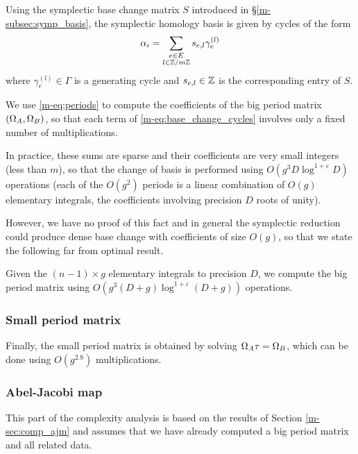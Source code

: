 \documentclass[main.tex]{subfiles}
\begin{document}
   Using the symplectic base change matrix $S$ introduced
   in \S \ref{m-subsec:symp_basis}, the symplectic homology basis is given
   by cycles of the form
   \begin{equation}
       \label{eq:base_change_cycles}
       \alpha_i = \sum_{\substack{e \in E \\ l\in\mathbb{Z}/m\mathbb{Z}}} s_{e,l}\gamma_e^{(l)}
   \end{equation}
   where $\gamma_e^{(l)} \in \Gamma$ is a generating cycle
   and $s_{e,l}\in\mathbb{Z}$ is the corresponding entry of $S$.

   We use \eqref{m-eq:periods} to compute the coefficients of the big period
   matrix $(\Omega_A,\Omega_B)$, so that each term of \eqref{m-eq:base_change_cycles}
   involves only a fixed number of multiplications.

   In practice, these sums are sparse and their coefficients are very small integers
   (less than $m$), so that the change of basis is performed using
   $O(g^3D\log^{1+\varepsilon}D)$ operations
   (each of the $O(g^2)$ periods is a linear combination of $O(g)$ elementary integrals,
   the coefficients involving precision $D$ roots of unity).

   However, we have no proof of this fact and in general the symplectic reduction
   could produce dense base change with coefficients of size $O(g)$,
   so that we state the following far from optimal result.
   \begin{thm}
       Given the $(n-1)\times g$ elementary integrals to precision $D$,
       we compute the big period matrix using $O(g^3(D+g)\log^{1+\varepsilon}(D+g))$ operations.
   \end{thm}

   \subsubsection{Small period matrix}

   Finally, the small period matrix is obtained by solving $\Omega_A\tau=\Omega_B$,
   which can be done using $O(g^{2.8})$ multiplications.

   \subsubsection{Abel-Jacobi map}

  This part of the complexity analysis is based on the results of Section \ref{m-sec:comp_ajm} and assumes that we have already computed a big period matrix and all related data.
\end{document}
